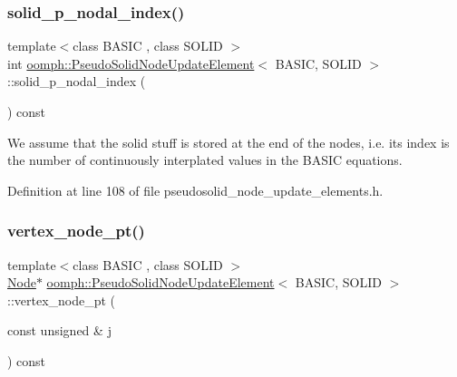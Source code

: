 \subsubsection{\texorpdfstring{solid\+\_\+p\+\_\+nodal\+\_\+index()}{solid\_p\_nodal\_index()}}
{\footnotesize\ttfamily template$<$class B\+A\+S\+IC , class S\+O\+L\+ID $>$ \\
int \hyperlink{classoomph_1_1PseudoSolidNodeUpdateElement}{oomph\+::\+Pseudo\+Solid\+Node\+Update\+Element}$<$ B\+A\+S\+IC, S\+O\+L\+ID $>$\+::solid\+\_\+p\+\_\+nodal\+\_\+index (\begin{DoxyParamCaption}{ }\end{DoxyParamCaption}) const\hspace{0.3cm}{\ttfamily [inline]}}



We assume that the solid stuff is stored at the end of the nodes, i.\+e. its index is the number of continuously interplated values in the B\+A\+S\+IC equations. 



Definition at line 108 of file pseudosolid\+\_\+node\+\_\+update\+\_\+elements.\+h.

\mbox{\label{classoomph_1_1PseudoSolidNodeUpdateElement_a6e580c17a0394f0dc056bbdc28229ea8}} 
\subsubsection{\texorpdfstring{vertex\+\_\+node\+\_\+pt()}{vertex\_node\_pt()}}
{\footnotesize\ttfamily template$<$class B\+A\+S\+IC , class S\+O\+L\+ID $>$ \\
\hyperlink{classoomph_1_1Node}{Node}$\ast$ \hyperlink{classoomph_1_1PseudoSolidNodeUpdateElement}{oomph\+::\+Pseudo\+Solid\+Node\+Update\+Element}$<$ B\+A\+S\+IC, S\+O\+L\+ID $>$\+::vertex\+\_\+node\+\_\+pt (\begin{DoxyParamCaption}\item[{const unsigned \&}]{j }\end{DoxyParamCaption}) const\hspace{0.3cm}{\ttfamily [inline]}}



